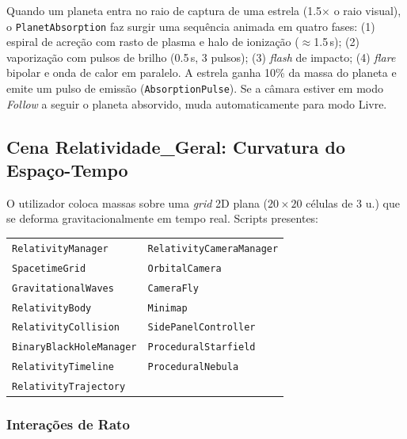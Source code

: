 \documentclass[12pt,a4paper]{article}
\begin{document}
Quando um planeta entra no raio de captura de uma estrela (1.5$\times$ o raio visual), o \texttt{PlanetAbsorption} faz surgir uma sequ\^{e}ncia animada em quatro fases: (1) espiral de acre\c{c}\~{a}o com rasto de plasma e halo de ioniza\c{c}\~{a}o ($\approx$1.5\,s); (2) vaporiza\c{c}\~{a}o com pulsos de brilho (0.5\,s, 3 pulsos); (3) \textit{flash} de impacto; (4) \textit{flare} bipolar e onda de calor em paralelo. A estrela ganha 10\% da massa do planeta e emite um pulso de emiss\~{a}o (\texttt{AbsorptionPulse}). Se a c\^{a}mara estiver em modo \textit{Follow} a seguir o planeta absorvido, muda automaticamente para modo Livre.


\subsection{Cena Relatividade\_Geral: Curvatura do Espa\c{c}o-Tempo}

O utilizador coloca massas sobre uma \textit{grid} 2D plana ($20 \times 20$ c\'{e}lulas de 3 u.) que se deforma gravitacionalmente em tempo real. Scripts presentes:

\begin{center}
  \small
  \begin{tabular}{ll}
    \texttt{RelativityManager} & \texttt{RelativityCameraManager} \\
    \texttt{SpacetimeGrid} & \texttt{OrbitalCamera} \\
    \texttt{GravitationalWaves} & \texttt{CameraFly} \\
    \texttt{RelativityBody} & \texttt{Minimap} \\
    \texttt{RelativityCollision} & \texttt{SidePanelController} \\
    \texttt{BinaryBlackHoleManager} & \texttt{ProceduralStarfield} \\
    \texttt{RelativityTimeline} & \texttt{ProceduralNebula} \\
    \texttt{RelativityTrajectory} & \\
  \end{tabular}
\end{center}

\subsubsection{Intera\c{c}\~{o}es de Rato}
\end{document}
